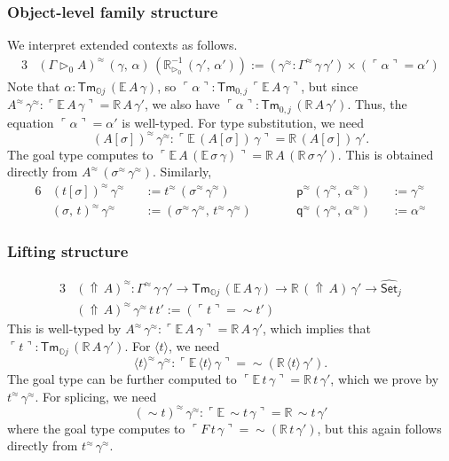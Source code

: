 \documentclass[acmsmall,anonymous,review]{acmart}
\newcommand{\msf}[1]{\mathsf{#1}}
\newcommand{\mbb}[1]{\mathbb{#1}}
\newcommand{\wh}[1]{\widehat{#1}}
\newcommand{\ext}{\triangleright}
\newcommand{\Lift}{{\Uparrow}}
\newcommand{\spl}{{\sim}}
\newcommand{\qut}[1]{\langle #1\rangle}
\newcommand{\mbbo}{\mbb{O}}
\newcommand{\Tm}{\msf{Tm}}
\newcommand{\p}{\mathsf{p}}
\newcommand{\q}{\mathsf{q}}
\newcommand{\Set}{\mathsf{Set}}
\newcommand{\emb}[1]{\ulcorner#1\urcorner}
\newcommand{\ev}{\mbb{E}}
\newcommand{\re}{\mbb{R}}
\theoremstyle{remark}
\newcommand{\whset}{\wh{\Set}}
\newcommand{\rextizero}{\re_{\ext_0}^{-1}}
\newcommand{\rel}{^{\approx}}
\begin{document}
\subsubsection{Object-level family structure} We interpret extended contexts as follows.
\begin{alignat*}{3}
  & (\Gamma \ext_0 A)\rel\,(\gamma,\,\alpha)\,(\rextizero\,(\gamma',\,\alpha')) := (\gamma\rel : \Gamma\rel\,\gamma\,\gamma') \times (\emb{\alpha} = \alpha')
\end{alignat*}
Note that $\alpha : \Tm_{\mbbo j}\,(\ev\,A\,\gamma)$, so $\emb{\alpha} :
\Tm_{0,j}\,\emb{\ev\,A\,\gamma}$, but since $A\rel\,\gamma\rel :
\emb{\ev\,A\,\gamma} = \re\,A\,\gamma'$, we also have $\emb{\alpha} :
\Tm_{0,j}\,(\re\,A\,\gamma')$. Thus, the equation $\emb{\alpha} = \alpha'$ is
well-typed. For type substitution, we need
\[
  (A[\sigma])\rel\,\gamma\rel : \emb{\ev\,(A[\sigma])\,\gamma} = \re\,(A[\sigma])\,\gamma'.
\]
The goal type computes to $\emb{\ev\,A\,(\ev\,\sigma\,\gamma)} =
\re\,A\,(\re\,\sigma\,\gamma')$. This is obtained directly from
$A\rel\,(\sigma\rel\,\gamma\rel)$.  Similarly,
\begin{alignat*}{6}
  & (t[\sigma])\rel\,\gamma\rel &&:= t\rel\,(\sigma\rel\,\gamma\rel) && \p\rel\,(\gamma\rel,\,\alpha\rel) &&:= \gamma\rel \\
  & (\sigma,\,t)\rel\,\gamma\rel &&:= (\sigma\rel\,\gamma\rel,\,t\rel\,\gamma\rel)\hspace{2em}&& \q\rel\,(\gamma\rel,\,\alpha\rel) &&:= \alpha\rel
\end{alignat*}

\subsubsection{Lifting structure}
\begin{alignat*}{3}
  &(\Lift\,A)\rel : \Gamma\rel\,\gamma\,\gamma' \to \Tm_{\mbbo j}\,(\ev\,A\,\gamma) \to \re\,(\Lift\,A)\,\gamma' \to \whset_j\\
  &(\Lift\,A)\rel\,\gamma\rel\,t\,t' := (\emb{t} = \spl t')
\end{alignat*}
This is well-typed by $A\rel\,\gamma\rel : \emb{\ev\,A\,\gamma} = \re\,A\,\gamma'$, which implies
that $\emb{t} : \Tm_{\mbbo j}\,(\re\,A\,\gamma')$. For $\qut{t}$, we need
\[  \qut{t}\rel\,\gamma\rel : \emb{\ev\,\qut{t}\,\gamma} = \spl(\re\,\qut{t}\,\gamma'). \]
The goal type can be further computed to $\emb{\ev\,t\,\gamma} = \re\,t\,\gamma'$, which we prove
by $t\rel\,\gamma\rel$. For splicing, we need
\[
  (\spl t)\rel\,\gamma\rel : \emb{\ev\,\spl t\,\gamma} = \re\,\spl t\,\gamma'
\]
where the goal type computes to $\emb{F\,t\,\gamma} = \spl(\re\,t\,\gamma')$,
but this again follows directly from $t\rel\,\gamma\rel$.
\end{document}
